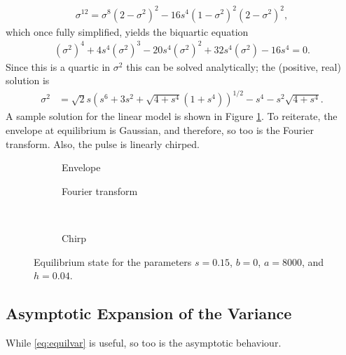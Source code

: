 \begin{align*}
\sigma^{12} = \sigma^8 (2 - \sigma^2)^2 - 16s^4 (1 - \sigma^2)^2 (2 - \sigma^2)^2,
\end{align*}
which once fully simplified, yields the biquartic equation
\begin{align}
\label{eq:var}
\left( \sigma^2 \right)^4 + 4 s^4 \left( \sigma^2 \right)^3 - 20 s^4 \left( \sigma^2 \right)^2 + 32 s^4 \left( \sigma^2 \right) - 16 s^4 = 0.
\end{align}
Since this is a quartic in $\sigma^2$ this can be solved analytically; the (positive, real) solution is
\begin{align}
\label{eq:equilvar}
\sigma^2 &= \sqrt{2} s \left( s^6 + 3s^2 + \sqrt{4 + s^4} \left( 1 + s^4 \right) \right)^{1/2} - s^4 - s^2 \sqrt{4 + s^4}.
\end{align}
A sample solution for the linear model is shown in Figure \ref{fig:linear}. To reiterate, the envelope at equilibrium is Gaussian, and therefore, so too is the Fourier transform. Also, the pulse is linearly chirped. \\

\begin{figure}[tbp]
\centering
\begin{subfigure}{0.5\textwidth}
\centering

\caption{Envelope}
\end{subfigure}%
\begin{subfigure}{0.5\textwidth}
\centering

\caption{Fourier transform}
\end{subfigure} \\
\begin{subfigure}{0.5\textwidth}
\centering

\caption{Chirp}
\end{subfigure}
\caption[Envelope, Fourier transform, and chirp of the pulse---linear case.]{Equilibrium state for the parameters $s = 0.15$, $b = 0$, $a = 8000$, and $h = 0.04$.}
\label{fig:linear}
\end{figure}

\subsection{Asymptotic Expansion of the Variance}
While \eqref{eq:equilvar} is useful, so too is the asymptotic behaviour.


